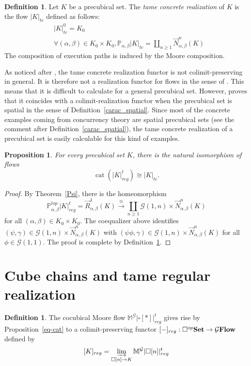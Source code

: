 \documentclass[a4paper,12pt]{amsart}
\newcommand{\p}{\times}
\renewcommand{\vec}{\overrightarrow}
\renewcommand{\P}{\mathbb{P}}
\newtheorem{prop}[thm]{Proposition}
\newcommand{\bp}{\begin{prop}}
\newcommand{\ep}{\end{prop}}
\newcommand{\bpf}{\begin{proof}}
\newcommand{\epf}{\end{proof}}
\theoremstyle{definition}
\newtheorem{defn}[thm]{Definition}
\newcommand{\bd}{\begin{defn}}
\newcommand{\ed}{\end{defn}}
\newcommand{\iso}{\cong}
\renewcommand{\geq}{\geqslant}
\newcommand{\moore}{{\mathbb{M}}}
\newcommand{\brm}[1]{{\rm{\mathbf{#1}}}}
\newcommand{\dtopG}{{\mathcal{G}\brm{Flow}}}
\newcommand{\set}{{\brm{Set}}}
\DeclareMathOperator{\Cat}{\mathrm{cat}}
\newcommand{\liminj}{\varinjlim}
\renewcommand{\P}{\mathbb{P}}
\begin{document}
\bd \label{rea_conc} \cite[Definition~7.1]{NaturalRealization}
Let $K$ be a precubical set. The \textit{tame concrete realization} of $K$ is the flow $|K|_{tc}$ defined as follows:
\begin{align*}
	& |K|_{tc}^0=K_0 \\
	& \forall (\alpha,\beta)\in K_0\p K_0, \P_{\alpha,\beta} |K|_{tc}=\coprod_{n\geq 1}\vec{N}_{\alpha,\beta}^n(K)
\end{align*}
The composition of execution paths is induced by the Moore composition.
\ed

As noticed after \cite[Theorem~7.7]{NaturalRealization}, the tame concrete realization functor is not colimit-preserving in general. It is therefore not a realization functor for flows in the sense of \cite[Definition~3.6]{NaturalRealization}. This means that it is difficult to calculate for a general precubical set. However, \cite[Theorem~7.7]{NaturalRealization} proves that it coincides with a colimit-realization functor when the precubical set is spatial in the sense of Definition~\ref{carac_spatial}. Since most of the concrete examples coming from concurrency theory are spatial precubical sets (see the comment after Definition~\ref{carac_spatial}), the tame concrete realization of a precubical set is easily calculable for this kind of examples.


\bp \label{same}
For every precubical set $K$, there is the natural isomorphism of flows \[\Cat(|K|^t_{reg})\iso |K|_{tc}.\]
\ep

\bpf 
By Theorem~\ref{Psi}, there is the homeomorphism
\[
\P^{top}_{\alpha,\beta}|K|^t_{reg} = \vec{R}_{\alpha,\beta}^{1}(K) \stackrel{\iso}\longrightarrow \displaystyle\coprod_{n\geq 1} \mathcal{G}(1,n) \p \vec{N}_{\alpha,\beta}^n(K)
\]
for all $(\alpha,\beta)\in K_0\p K_0$. The coequalizer above identifies $(\psi,\gamma)\in \mathcal{G}(1,n) \p \vec{N}_{\alpha,\beta}^n(K)$ with $(\psi\phi,\gamma)\in \mathcal{G}(1,n) \p \vec{N}_{\alpha,\beta}^n(K)$ for all $\phi\in \mathcal{G}(1,1)$. The proof is complete by Definition~\ref{rea_conc}.
\epf


\section{Cube chains and tame regular realization}
\label{cubechain}
 

\bd
The cocubical Moore flow $\moore^{\mathcal{G}}|\square[*]|^t_{reg}$ gives rise by Proposition~\ref{eq-cat} to a colimit-preserving functor $[-]_{reg} : \square^{op}\set\to \dtopG$ defined by 
\[
[K]_{reg} = \liminj_{\square[n]\rightarrow K} \moore^{\mathcal{G}}|\square[n]|^t_{reg}
\]
\ed
\end{document}
